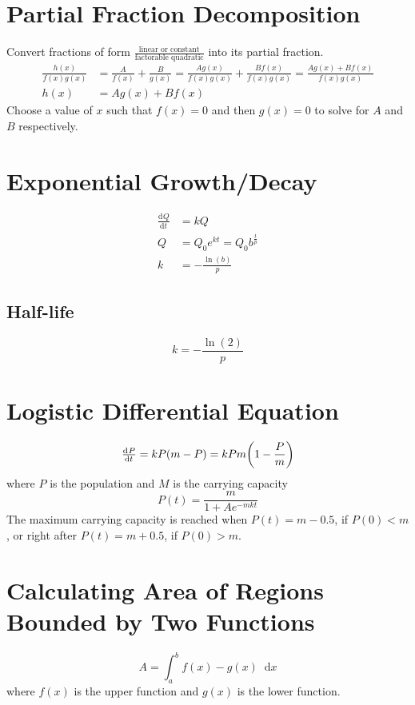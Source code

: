 \documentclass[12pt]{article}
\DeclarePairedDelimiter\paren{(}{)}
\newcommand*{\dd}[3][]{\tfrac{\mathrm{d}^{#1}#2}{\mathrm{d}#3^{#1}}}
\newcommand*{\D}[1]{\mathop{}\!\mathrm{d}#1}
\newcommand*{\fixmath}{%
  \makebox{}\vspace{\glueexpr-\baselineskip-\abovedisplayskip}}
\newenvironment{fixaskip}{\setlength{\abovedisplayskip}{0pt}\fixmath%
  \ignorespaces}{\ignorespacesafterend}
\newenvironment{fixskip}{\setlength{\abovedisplayskip}{0pt}%
  \setlength{\belowdisplayskip}{0pt}\fixmath\ignorespaces}%
  {\ignorespacesafterend}
\begin{document}
\section*{Partial Fraction Decomposition}
Convert fractions of form \(\frac{\text{linear or constant}}{\text{factorable
quadratic}}\) into its partial fraction.
\begin{align*}
  \frac{h(x)}{f(x)g(x)} &= \frac{A}{f(x)} + \frac{B}{g(x)} = \frac{Ag(x)}
  {f(x)g(x)} + \frac{Bf(x)}{f(x)g(x)} = \frac{Ag(x) + Bf(x)}{f(x)g(x)}\\
  h(x) &= Ag(x) + Bf(x)
\end{align*}
Choose a value of \(x\) such that \(f(x) = 0\) and then \(g(x) = 0\) to solve
for \(A\) and \(B\) respectively.
\section*{Exponential Growth\slash Decay}
\begin{fixskip}
  \begin{align*}
    \dd{Q}{t} &= kQ\\
    Q &= Q_0 e^{kt} = Q_0 b^{\frac{t}{p}}\\
    k &= -\frac{\ln(b)}{p}
  \end{align*}
\end{fixskip}
\subsection*{Half-life}
\begin{fixskip}
  \[
    k = -\frac{\ln(2)}{p}
  \]
\end{fixskip}
\section*{Logistic Differential Equation}
\begin{fixaskip}
  \[
    \dd{P}{t} = kP(m - P) = kPm\paren*{1-\frac{P}{m}}
  \]
\end{fixaskip}
where \(P\) is the population and \(M\) is the carrying capacity
\[
  P(t) = \frac{m}{1 + Ae^{-mkt}}
\]
The maximum carrying capacity is reached when \(P(t) = m - 0.5\), if \(P(0) <
m\), or right after \(P(t) = m + 0.5\), if \(P(0) > m\).
\section*{Calculating Area of Regions Bounded by Two Functions}
\begin{fixaskip}
  \[
    A = \int_a^b f(x) - g(x) \D{x}
  \]
\end{fixaskip}
where \(f(x)\) is the upper function and \(g(x)\) is the lower function.
\end{document}
